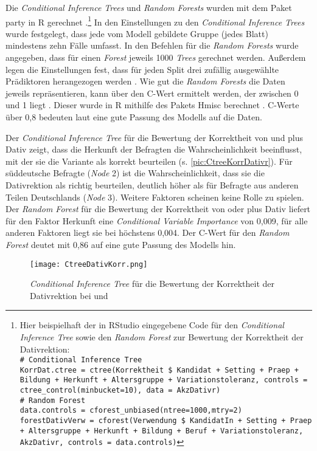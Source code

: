 Die \textit{Conditional Inference Trees} und \textit{Random Forests} wurden mit dem Paket party in R gerechnet \citep[][Version 1.3-4]{Hothorn.2010}.\footnote{Hier beispielhaft der in RStudio eingegebene Code für den \textit{Conditional Inference Tree} sowie den \textit{Random Forest} zur Bewertung der Korrektheit der Dativrektion:\\
\texttt{\# Conditional Inference Tree \\
KorrDat.ctree = ctree(Korrektheit \$ Kandidat + Setting + Praep + Bildung + Herkunft + Altersgruppe + Variationstoleranz, controls = ctree\_control(minbucket=10), data = AkzDativr)\\
\# Random Forest \\
data.controls = cforest\_unbiased(ntree=1000,mtry=2)\\
forestDativVerw = cforest(Verwendung \$ KandidatIn + Setting + Praep + Altersgruppe + Herkunft + Bildung + Beruf + Variationstoleranz, AkzDativr, controls = data.controls)}
}
In den Einstellungen zu den \textit{Conditional Inference Trees} wurde festgelegt, dass jede vom Modell gebildete Gruppe (jedes \glqq Blatt\grqq) mindestens zehn Fälle umfasst. 
In den Befehlen für die \textit{Random Forests} wurde angegeben, dass für einen \textit{Forest} jeweils 1000 \textit{Trees} gerechnet werden. 
Außerdem legen die Einstellungen fest, dass für jeden Split drei zufällig ausgewählte Prädiktoren herangezogen werden \citep[s.][297]{Levshina.2015}.
Wie gut die \textit{Random Forests} die Daten jeweils repräsentieren, kann über den C-Wert ermittelt werden, der zwischen 0 und 1 liegt \citep[s.][299]{Levshina.2015}. 
Dieser wurde in R mithilfe des Pakets Hmisc berechnet \citep[][Version 4.4-0]{Harrell.2020}.
C-Werte über 0,8 bedeuten laut \citet[156]{Tagliamonte.2012} eine gute Passung des Modells auf die Daten. 

Der \textit{Conditional Inference Tree} für die Bewertung der Korrektheit von \wegen{} und \waehrend{} plus Dativ zeigt, dass die Herkunft der Befragten die Wahrscheinlichkeit beeinflusst, mit der sie die Variante als korrekt beurteilen (s. \autoref{pic:CtreeKorrDativr}). 
Für süddeutsche Befragte (\textit{Node} 2) ist die Wahrscheinlichkeit, dass sie die Dativrektion als richtig beurteilen, deutlich höher als für Befragte aus anderen Teilen Deutschlands (\textit{Node} 3). 
Weitere Faktoren scheinen keine Rolle zu spielen. 
Der \textit{Random Forest} für die Bewertung der Korrektheit von \wegen{} oder \waehrend{} plus Dativ liefert für den Faktor \glqq Herkunft\grqq{} eine \textit{Conditional Variable Importance} von 0,009, für alle anderen Faktoren liegt sie bei höchstens 0,004. 
Der C-Wert für den \textit{Random Forest} deutet mit 0,86 auf eine gute Passung des Modells hin. 
\begin{figure}
\centering
\texttt{[image: CtreeDativKorr.png]}
\caption{\textit{Conditional Inference Tree} für die Bewertung der Korrektheit der Dativrektion bei \wegen{} und \waehrend}
\label{pic:CtreeKorrDativr}
\end{figure}

